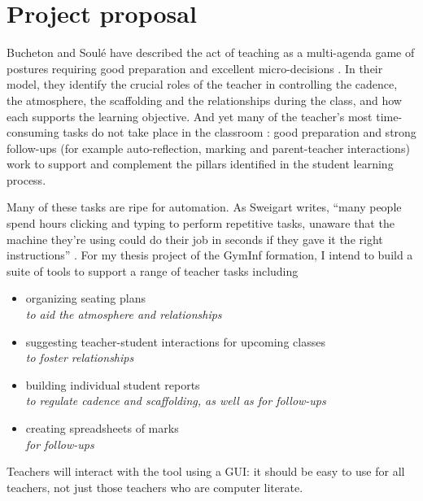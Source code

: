 \documentclass[10pt]{article}
\begin{document}
\section{Project proposal}

Bucheton and Soulé have described the act of teaching as a multi-agenda game of postures requiring good preparation and excellent micro-decisions \cite{BS09}. In their model, they identify the crucial roles of the teacher in controlling the cadence, the atmosphere, the scaffolding and the relationships during the class, and how each supports the learning objective. And yet many of the teacher's most time-consuming tasks do not take place in the classroom \cite{Bryant20}: good preparation and strong follow-ups (for example auto-reflection, marking and parent-teacher interactions) work to support and complement the pillars identified in the student learning process.

Many of these tasks are ripe for automation. As Sweigart writes, ``many people spend hours clicking and typing to perform repetitive tasks, unaware that the machine they’re using could do their job in seconds if they gave it the right instructions'' \cite{Swei15}.  For my thesis project of the GymInf formation, I intend to build a suite of tools to support a range of teacher tasks including 
\begin{itemize} 
\item organizing seating plans \\
\emph{to aid the atmosphere and relationships} 
\item suggesting teacher-student interactions for upcoming classes \\
\emph{to foster relationships}
\item building individual student reports \\
\emph{to regulate cadence and scaffolding, as well as for follow-ups}
\item creating spreadsheets of marks \\
\emph{for follow-ups}
\end{itemize}
Teachers will interact with the tool using a GUI: it should be easy to use for all teachers, not just those teachers who are computer literate.
\end{document}

